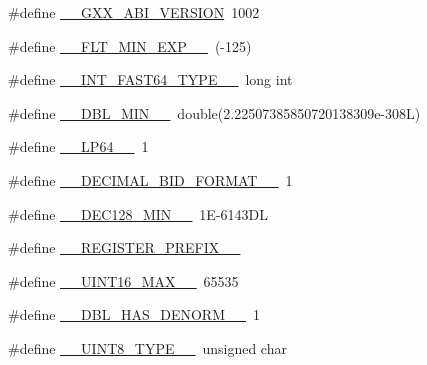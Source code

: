 \begin{DoxyCompactItemize}
\#define \hyperlink{build-analizer__host-_desktop___qt__5__9__0___g_c_c__64bit-_release_2moc__predefs_8h_aee5d0901405056d87e3bd47fee83128d}{\+\_\+\+\_\+\+G\+X\+X\+\_\+\+A\+B\+I\+\_\+\+V\+E\+R\+S\+I\+O\+N}~1002
\item 
\#define \hyperlink{build-analizer__host-_desktop___qt__5__9__0___g_c_c__64bit-_release_2moc__predefs_8h_acd7b9de9b6bd817027cb37ec6c82cba9}{\+\_\+\+\_\+\+F\+L\+T\+\_\+\+M\+I\+N\+\_\+\+E\+X\+P\+\_\+\+\_\+}~(-\/125)
\item 
\#define \hyperlink{build-analizer__host-_desktop___qt__5__9__0___g_c_c__64bit-_release_2moc__predefs_8h_a65967d857259eb36c9546a512f2ab4b5}{\+\_\+\+\_\+\+I\+N\+T\+\_\+\+F\+A\+S\+T64\+\_\+\+T\+Y\+P\+E\+\_\+\+\_\+}~long int
\item 
\#define \hyperlink{build-analizer__host-_desktop___qt__5__9__0___g_c_c__64bit-_release_2moc__predefs_8h_a3b29a64a7b1529c08f87d256d20aade1}{\+\_\+\+\_\+\+D\+B\+L\+\_\+\+M\+I\+N\+\_\+\+\_\+}~double(2.\+22507385850720138309e-\/308\+L)
\item 
\#define \hyperlink{build-analizer__host-_desktop___qt__5__9__0___g_c_c__64bit-_release_2moc__predefs_8h_a1939a48605c72ad163215e2279590fd5}{\+\_\+\+\_\+\+L\+P64\+\_\+\+\_\+}~1
\item 
\#define \hyperlink{build-analizer__host-_desktop___qt__5__9__0___g_c_c__64bit-_release_2moc__predefs_8h_a31d221e4eef1a1f2104fe93a4236cae0}{\+\_\+\+\_\+\+D\+E\+C\+I\+M\+A\+L\+\_\+\+B\+I\+D\+\_\+\+F\+O\+R\+M\+A\+T\+\_\+\+\_\+}~1
\item 
\#define \hyperlink{build-analizer__host-_desktop___qt__5__9__0___g_c_c__64bit-_release_2moc__predefs_8h_afa4fe1921202e3770143345532136860}{\+\_\+\+\_\+\+D\+E\+C128\+\_\+\+M\+I\+N\+\_\+\+\_\+}~1\+E-\/6143\+D\+L
\item 
\#define \hyperlink{build-analizer__host-_desktop___qt__5__9__0___g_c_c__64bit-_release_2moc__predefs_8h_a08d4062230ffc8494f4be4f6447497e4}{\+\_\+\+\_\+\+R\+E\+G\+I\+S\+T\+E\+R\+\_\+\+P\+R\+E\+F\+I\+X\+\_\+\+\_\+}
\item 
\#define \hyperlink{build-analizer__host-_desktop___qt__5__9__0___g_c_c__64bit-_release_2moc__predefs_8h_a17f94731962876cdac979ae093f52605}{\+\_\+\+\_\+\+U\+I\+N\+T16\+\_\+\+M\+A\+X\+\_\+\+\_\+}~65535
\item 
\#define \hyperlink{build-analizer__host-_desktop___qt__5__9__0___g_c_c__64bit-_release_2moc__predefs_8h_ace59605d6645350a7c5cced76ffb27fa}{\+\_\+\+\_\+\+D\+B\+L\+\_\+\+H\+A\+S\+\_\+\+D\+E\+N\+O\+R\+M\+\_\+\+\_\+}~1
\item 
\#define \hyperlink{build-analizer__host-_desktop___qt__5__9__0___g_c_c__64bit-_release_2moc__predefs_8h_a0f22edb92c4da8029783c424962ac30d}{\+\_\+\+\_\+\+U\+I\+N\+T8\+\_\+\+T\+Y\+P\+E\+\_\+\+\_\+}~unsigned char

\end{DoxyCompactItemize}
